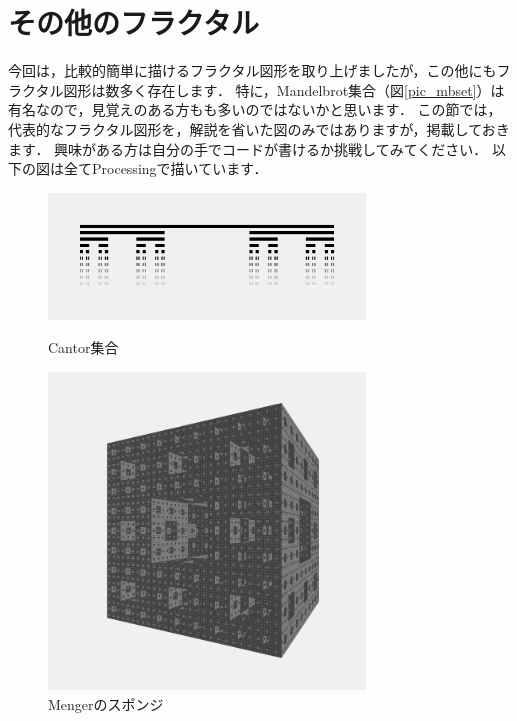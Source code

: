 \documentclass[dvipdfmx]{jsarticle}
\theoremstyle{definition}
\begin{document}
\section{その他のフラクタル}  \label{sec_other_fractal}
今回は，比較的簡単に描けるフラクタル図形を取り上げましたが，この他にもフラクタル図形は数多く存在します．
特に，Mandelbrot集合（図\ref{pic_mbset}）は有名なので，見覚えのある方もも多いのではないかと思います．
この節では，代表的なフラクタル図形を，解説を省いた図のみではありますが，掲載しておきます．
興味がある方は自分の手でコードが書けるか挑戦してみてください．
以下の図は全てProcessingで描いています．
\vspace{\baselineskip}

\begin{figure}[H]
    \begin{minipage}{0.49\hsize}
        \centering
        \includegraphics[width=0.75\textwidth]{figure/others/relatives/cantor_set.png}
        \caption{Cantor集合}
        \label{pic_cantorset}
    \end{minipage}
    \begin{minipage}{0.49\hsize}
        \centering
        \includegraphics[width=0.75\textwidth]{figure/others/relatives/sponge.png}
        \caption{Mengerのスポンジ}
        \label{pic_menger_sponge}
    \end{minipage}
\end{figure}
\end{document}
